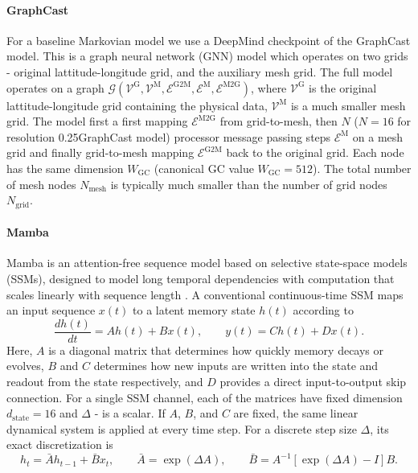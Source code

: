 \documentclass{article}
\begin{document}
\paragraph{GraphCast}
For a baseline Markovian model we use a DeepMind checkpoint of the GraphCast model. This is a graph neural network (GNN) model which operates on two grids - original lattitude-longitude grid, and the auxiliary mesh grid. The full model operates on a graph $\mathcal{G}(\mathcal{V}^{\textrm{G}},\mathcal{V}^{\textrm{M}},\mathcal{E}^{\textrm{G2M}},\mathcal{E}^{\textrm{M}},\mathcal{E}^{\textrm{M2G}})$, where $\mathcal{V}^{\textrm{G}}$ is the original lattitude-longitude grid containing the physical data, $\mathcal{V}^{\textrm{M}}$ is a much smaller mesh grid. The model first a first mapping $\mathcal{E}^{\textrm{M2G}}$ from grid-to-mesh, then $N$ ($N=16$ for resolution 0.25\degree GraphCast model) processor message passing steps $\mathcal{E}^{\textrm{M}}$ on a mesh grid and finally grid-to-mesh mapping $\mathcal{E}^{\textrm{G2M}}$ back to the original grid. Each node has the same dimension $W_{\textrm{GC}}$ (canonical GC value $W_{\textrm{GC}}=512$). The total number of mesh nodes $N_{\textrm{mesh}}$ is typically much smaller than the number of grid nodes $N_{\textrm{grid}}$.

\paragraph{Mamba}
Mamba is an attention-free sequence model based on selective state-space models (SSMs), designed to model long temporal dependencies with computation that scales linearly with sequence length \cite{gu2023Mamba}. A conventional continuous-time SSM maps an input sequence $x(t)$ to a latent memory state $h(t)$ according to
\begin{equation}
    \frac{d h(t)}{dt} = A h(t) + B x(t),
    \qquad
    y(t) = C h(t) + D x(t).
\end{equation}
Here, $A$ is a diagonal matrix that determines how quickly memory decays or evolves, $B$ and $C$ determines how new inputs are written into the state and readout from the state respectively, and $D$ provides a direct input-to-output skip connection. For a single SSM channel, each of the matrices have fixed dimension $d_{\textrm{state}}=16$ and $\Delta$ - is a scalar. If $A$, $B$, and $C$ are fixed, the same linear dynamical system is applied at every time step. For a discrete step size $\Delta$, its exact discretization is
\begin{equation}
    h_t = \bar{A} h_{t-1} + \bar{B}x_t,
    \qquad
    \bar{A} = \exp(\Delta A),
    \qquad
    \bar{B} = A^{-1}\left[\exp(\Delta A)-I\right]B.
\end{equation}
\end{document}
